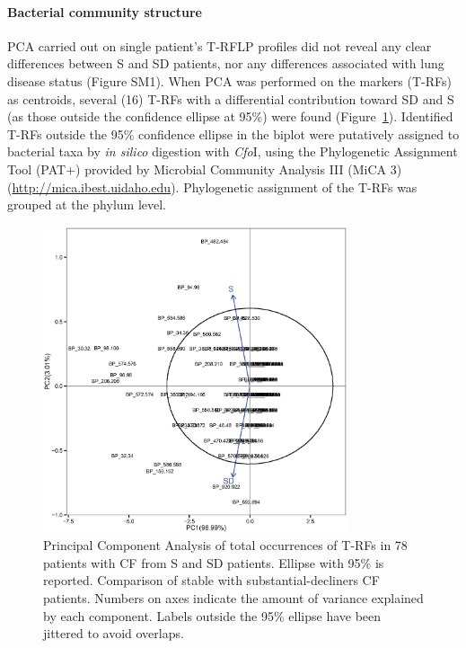 \paragraph{Bacterial community structure} PCA carried out on single patient's T-RFLP profiles did not reveal any clear differences between S and SD patients, nor any differences associated with lung disease status (Figure SM1). When PCA was performed on the markers (T-RFs) as centroids, several (16) T-RFs with a differential contribution toward SD and S (as those outside the confidence ellipse at 95\%) were found (Figure~\ref{fig:fig3condtrf}). Identified T-RFs outside the 95\% confidence ellipse in the biplot were putatively assigned to bacterial taxa by \textit{in silico} digestion with \textit{Cfo}I, using the Phylogenetic Assignment Tool (PAT+) provided by Microbial Community Analysis III (MiCA 3) (\href{http://mica.ibest.uidaho.edu/}{http://mica\-.ibest\-.uidaho\-.edu}). Phylogenetic assignment of the T-RFs was grouped at the phylum level.\\ 
\begin{figure}[!tb]
	\centering
	\includegraphics[width=0.8\textwidth]{./figures/Chapter_7/Figure_3_cond_trf}
  	\caption{\label{fig:fig3condtrf}Principal Component Analysis of total occurrences of T-RFs in 78 patients with CF from S and SD patients. Ellipse with 95\% is reported. Comparison of stable with substantial-decliners CF patients. Numbers on axes indicate the amount of variance explained by each component. Labels outside the 95\% ellipse have been jittered to avoid overlaps.}
\end{figure}
